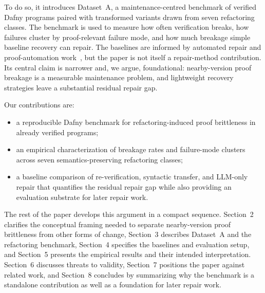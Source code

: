 To do so, it introduces Dataset~A, a maintenance-centred benchmark of verified Dafny programs paired with transformed variants drawn from seven refactoring classes. The benchmark is used to measure how often verification breaks, how failures cluster by proof-relevant failure mode, and how much breakage simple baseline recovery can repair. The baselines are informed by automated repair and proof-automation work~\cite{Gazzola2017AutomaticSoftwareRepair,Xia2023APRWithPLM,First2020TacTok,SanchezStern2023Passport,Misu2024AIAssistedDafny}, but the paper is not itself a repair-method contribution. Its central claim is narrower and, we argue, foundational: nearby-version proof breakage is a measurable maintenance problem, and lightweight recovery strategies leave a substantial residual repair gap.

Our contributions are:
\begin{itemize}
  \item a reproducible Dafny benchmark for refactoring-induced proof brittleness in already verified programs;
  \item an empirical characterization of breakage rates and failure-mode clusters across seven semantics-preserving refactoring classes;
  \item a baseline comparison of re-verification, syntactic transfer, and LLM-only repair that quantifies the residual repair gap while also providing an evaluation substrate for later repair work.
\end{itemize}

The rest of the paper develops this argument in a compact sequence. Section~2 clarifies the conceptual framing needed to separate nearby-version proof brittleness from other forms of change, Section~3 describes Dataset~A and the refactoring benchmark, Section~4 specifies the baselines and evaluation setup, and Section~5 presents the empirical results and their intended interpretation. Section~6 discusses threats to validity, Section~7 positions the paper against related work, and Section~8 concludes by summarizing why the benchmark is a standalone contribution as well as a foundation for later repair work.
